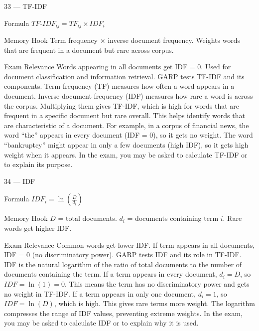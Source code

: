 \documentclass[aspectratio=169,8pt]{beamer}
\begin{document}
	\begin{frame}{33 --- TF-IDF}
		\begin{block}{Formula}
			$TF\text{-}IDF_{ij} = TF_{ij} \times IDF_i$
		\end{block}
		\begin{block}{Memory Hook}
			Term frequency $\times$ inverse document frequency. Weights words that are frequent in a document but rare across corpus.
		\end{block}
		\begin{block}{Exam Relevance}
			Words appearing in all documents get IDF = 0. Used for document classification and information retrieval. GARP tests TF-IDF and its components. Term frequency (TF) measures how often a word appears in a document. Inverse document frequency (IDF) measures how rare a word is across the corpus. Multiplying them gives TF-IDF, which is high for words that are frequent in a specific document but rare overall. This helps identify words that are characteristic of a document. For example, in a corpus of financial news, the word ``the'' appears in every document (IDF = 0), so it gets no weight. The word ``bankruptcy'' might appear in only a few documents (high IDF), so it gets high weight when it appears. In the exam, you may be asked to calculate TF-IDF or to explain its purpose.
		\end{block}
	\end{frame}
	
	\begin{frame}{34 --- IDF}
		\begin{block}{Formula}
			$IDF_i = \ln\left(\frac{D}{d_i}\right)$
		\end{block}
		\begin{block}{Memory Hook}
			$D$ = total documents. $d_i$ = documents containing term $i$. Rare words get higher IDF.
		\end{block}
		\begin{block}{Exam Relevance}
			Common words get lower IDF. If term appears in all documents, IDF = 0 (no discriminatory power). GARP tests IDF and its role in TF-IDF. IDF is the natural logarithm of the ratio of total documents to the number of documents containing the term. If a term appears in every document, $d_i = D$, so $IDF = \ln(1) = 0$. This means the term has no discriminatory power and gets no weight in TF-IDF. If a term appears in only one document, $d_i = 1$, so $IDF = \ln(D)$, which is high. This gives rare terms more weight. The logarithm compresses the range of IDF values, preventing extreme weights. In the exam, you may be asked to calculate IDF or to explain why it is used.
		\end{block}
	\end{frame}
	
\end{document}
